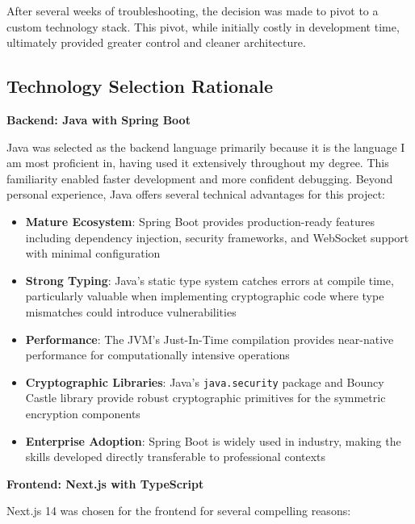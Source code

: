 \documentclass[11pt,a4paper]{article}
\begin{document}
After several weeks of troubleshooting, the decision was made to pivot to a custom technology stack. This pivot, while initially costly in development time, ultimately provided greater control and cleaner architecture.

\subsection{Technology Selection Rationale}

\textbf{Backend: Java with Spring Boot}

Java was selected as the backend language primarily because it is the language I am most proficient in, having used it extensively throughout my degree. This familiarity enabled faster development and more confident debugging. Beyond personal experience, Java offers several technical advantages for this project:

\begin{itemize}
    \item \textbf{Mature Ecosystem}: Spring Boot provides production-ready features including dependency injection, security frameworks, and WebSocket support with minimal configuration
    \item \textbf{Strong Typing}: Java's static type system catches errors at compile time, particularly valuable when implementing cryptographic code where type mismatches could introduce vulnerabilities
    \item \textbf{Performance}: The JVM's Just-In-Time compilation provides near-native performance for computationally intensive operations
    \item \textbf{Cryptographic Libraries}: Java's \texttt{java.security} package and Bouncy Castle library provide robust cryptographic primitives for the symmetric encryption components
    \item \textbf{Enterprise Adoption}: Spring Boot is widely used in industry, making the skills developed directly transferable to professional contexts
\end{itemize}

\textbf{Frontend: Next.js with TypeScript}

Next.js 14 was chosen for the frontend for several compelling reasons:
\end{document}

